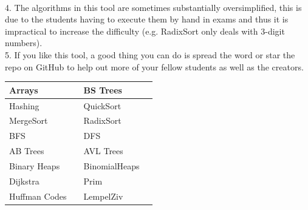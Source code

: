 \documentclass[12pt]{article}
\begin{document}
    \\[0.2in]
    4. The algorithms in this tool are sometimes substantially oversimplified, this is due to the students having to execute them by hand in exams
    and thus it is impractical to increase the difficulty (e.g. RadixSort only deals with 3-digit numbers).
    \\[0.2in]
    5. If you like this tool, a good thing you can do is spread the word or star the repo on GitHub to help out more of your fellow students as well as the creators.
    \vspace{20px}
    \begin{center}
        \begin{tabular}{|P{2.5cm}|P{1cm}|P{2.5cm}|P{1cm}|}
            \hline
            Arrays & %
            & BS Trees & %
            \\ \hline
            Hashing & %
            & QuickSort & %
            \\ \hline
            MergeSort & %
            & RadixSort & %
            \\ \hline
            BFS & %
            & DFS & %
            \\ \hline
            AB Trees & %
            & AVL Trees & %
            \\ \hline
            Binary Heaps & %
            & BinomialHeaps & %
            \\ \hline
            Dijkstra & %
            & Prim & %
            \\ \hline
            Huffman Codes & %
            & LempelZiv &  %
            \\ \hline
        \end{tabular}
    \end{center}
\end{document}

